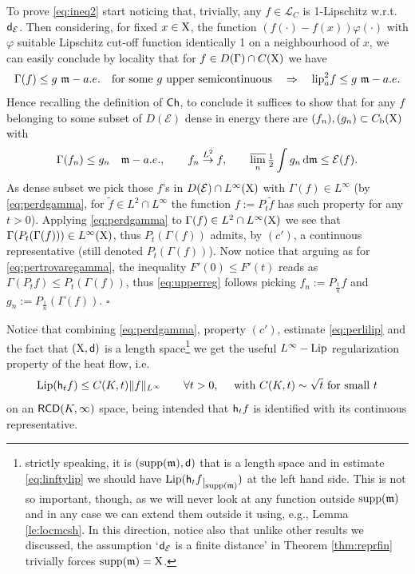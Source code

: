 \documentclass[11pt]{article}
\numberwithin{equation}{section}
\newenvironment{idea}{\removelastskip\par\medskip   %
\noindent{\em Idea of the proof} \rm}{\penalty-20\null\hfill$\square$\par\medbreak}
\newcommand{\restr}[1]{\lower3pt\hbox{$|_{#1}$}}
\newcommand{\X}{{\rm X}}
\newcommand{\sfd}{{\sf d}}
\newcommand{\mm}{{\mathfrak m}}
\newcommand{\RCD}{{\sf RCD}}
\newcommand{\ch}{{\sf Ch}}
\renewcommand{\d}{{\rm d}}
\newcommand{\Lip}{{\rm Lip}}
\newcommand{\lipa}{{\rm lip}_a}
\newcommand{\lims}{\varlimsup}
\renewcommand{\b}{{\rm b}}
\newcommand{\supp}{{\rm supp}}
\newcommand{\h}{{\sf h}} %
\begin{document}
\begin{idea}
To prove \eqref{eq:ineq2} start noticing that, trivially, any $f\in\mathcal L_C$ is 1-Lipschitz w.r.t.\ $\sfd_{\mathcal E}$. Then  considering, for fixed $x\in\X$, the function $(f(\cdot)-f(x))\varphi(\cdot)$ with $\varphi$ suitable Lipschitz cut-off function identically 1 on a neighbourhood of $x$, we can easily conclude by locality that for $f\in D(\Gamma)\cap C(\X)$ we have
\begin{equation}
\label{eq:perlilip}
\Gamma(f)\leq g\ \mm-a.e.\quad\text{for some $g$ upper semicontinuous}\quad\Rightarrow\quad \lipa^2 f\leq g\ \mm-a.e.
\end{equation}
Hence recalling the definition of $\ch$, to conclude it suffices to show that for any $f$ belonging to some subset of $D(\mathcal E)$ dense in energy there are $(f_n),(g_n)\subset C_\b(\X)$ with 
\begin{equation}
\label{eq:upperreg}
{\Gamma(f_n)}\leq g_n\quad \mm-a.e.,\qquad f_n\stackrel{L^2}\to f,\qquad\lims_n\tfrac12\int g_n\,\d\mm\leq \mathcal E(f).
\end{equation}
As dense subset we pick those $f$'s in $D(\mathcal E)\cap L^\infty(\X)$ with $\Gamma(f)\in L^\infty$ (by \eqref{eq:perdgamma}, for $\tilde f\in L^2\cap L^\infty$ the function $f:=P_t\tilde f$ has such property for any $t>0$). Applying   \eqref{eq:perdgamma} to ${\Gamma(f)}\in L^2\cap L^\infty(\X)$ we see that $\Gamma(P_t(\Gamma(f)))\in L^\infty(\X)$, thus $P_t(\Gamma(f))$ admits, by $(c')$,  a continuous representative (still denoted $P_t(\Gamma(f))$). Now notice that arguing as for \eqref{eq:pertrovaregamma}, the inequality $F'(0)\leq F'(t)$ reads as $\Gamma(P_tf)\leq P_t(\Gamma(f))$, thus \eqref{eq:upperreg} follows picking $f_n:=P_{\frac1n}f$ and $g_n:=P_{\frac1n}(\Gamma(f))$.
\end{idea}
Notice that combining \eqref{eq:perdgamma}, property $(c')$, estimate \eqref{eq:perlilip} and the fact that $(\X,\sfd)$ is a length space\footnote{strictly speaking, it is $(\supp(\mm),\sfd)$ that is a length space and in estimate \eqref{eq:linftylip} we should have $\Lip(\h_t f\restr{\supp(\mm)})$ at the left hand side. This is not so important, though, as we will never look at any function outside $\supp(\mm)$ and in any case we can extend them outside it using, e.g., Lemma \ref{le:locmcsh}. In this direction, notice also that unlike other results we discussed, the assumption `$\sfd_{\mathcal E}$ is a finite distance' in Theorem \ref{thm:reprfin} trivially forces $\supp(\mm)=\X$.} we get   the useful $L^\infty-\Lip$ regularization property of the heat flow, i.e.
\begin{equation}
\label{eq:linftylip}
\Lip(\h_t f)\leq C(K,t)\|f\|_{L^\infty}\qquad\forall t>0,\quad\text{ with }C(K,t)\sim\sqrt t\text{ for small }t
\end{equation}
on an $\RCD(K,\infty)$ space, being intended that $\h_tf$ is identified with its continuous representative. 
\end{document}
